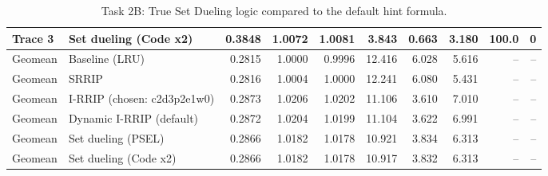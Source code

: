 \begin{table}[H]
{\begin{tabular}{llrrrrrrrr}
Trace 3 & Set dueling (Code x2) & 0.3848 & 1.0072 & 1.0081 & 3.843 & 0.663 & 3.180 & 100.0 & 0 \\
\midrule
Geomean & Baseline (LRU) & 0.2815 & 1.0000 & 0.9996 & 12.416 & 6.028 & 5.616 & -- & -- \\
Geomean & SRRIP & 0.2816 & 1.0004 & 1.0000 & 12.241 & 6.080 & 5.431 & -- & -- \\
Geomean & I-RRIP (chosen: c2d3p2e1w0) & 0.2873 & 1.0206 & 1.0202 & 11.106 & 3.610 & 7.010 & -- & -- \\
Geomean & Dynamic I-RRIP (default) & 0.2872 & 1.0204 & 1.0199 & 11.104 & 3.622 & 6.991 & -- & -- \\
Geomean & Set dueling (PSEL) & 0.2866 & 1.0182 & 1.0178 & 10.921 & 3.834 & 6.313 & -- & -- \\
Geomean & Set dueling (Code x2) & 0.2866 & 1.0182 & 1.0178 & 10.917 & 3.832 & 6.313 & -- & -- \\
\bottomrule
\end{tabular}}
\ifdim\wd\fitbx>\linewidth\resizebox{\linewidth}{!}{\usebox{\fitbx}}\else\usebox{\fitbx}\fi
\caption{Task 2B: True Set Dueling logic compared to the default hint formula.}\label{tab:t2b_duel}
\end{table}
